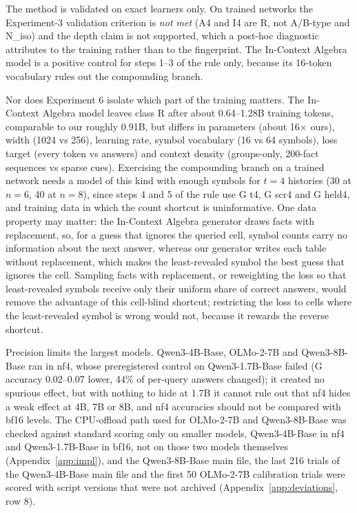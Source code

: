 \documentclass[11pt]{article}
\begin{document}
The method is validated on exact learners only. On trained networks the Experiment-3 validation criterion is \emph{not met} (A4 and I4 are R, not A/B-type and N\_iso) and the depth claim is not supported, which a post-hoc diagnostic attributes to the training rather than to the fingerprint. The In-Context Algebra model is a positive control for steps 1--3 of the rule only, because its 16-token vocabulary rules out the compounding branch.

Nor does Experiment 6 isolate which part of the training matters. The In-Context Algebra model leaves class R after about 0.64--1.28B training tokens, comparable to our roughly 0.91B, but differs in parameters (about 16$\times$ ours), width (1024 vs 256), learning rate, symbol vocabulary (16 vs 64 symbols), loss target (every token vs answers) and context density (groups-only, 200-fact sequences vs sparse cues). Exercising the compounding branch on a trained network needs a model of this kind with enough symbols for $t = 4$ histories (30 at $n = 6$, 40 at $n = 8$), since steps 4 and 5 of the rule use G t4, G scr4 and G held4, and training data in which the count shortcut is uninformative. One data property may matter: the In-Context Algebra generator draws facts with replacement, so, for a guess that ignores the queried cell, symbol counts carry no information about the next answer, whereas our generator writes each table without replacement, which makes the least-revealed symbol the best guess that ignores the cell. Sampling facts with replacement, or reweighting the loss so that least-revealed symbols receive only their uniform share of correct answers, would remove the advantage of this cell-blind shortcut; restricting the loss to cells where the least-revealed symbol is wrong would not, because it rewards the reverse shortcut.

Precision limits the largest models. Qwen3-4B-Base, OLMo-2-7B and Qwen3-8B-Base ran in nf4, whose preregistered control on Qwen3-1.7B-Base failed (G accuracy 0.02--0.07 lower, 44\% of per-query answers changed); it created no spurious effect, but with nothing to hide at 1.7B it cannot rule out that nf4 hides a weak effect at 4B, 7B or 8B, and nf4 accuracies should not be compared with bf16 levels. The CPU-offload path used for OLMo-2-7B and Qwen3-8B-Base was checked against standard scoring only on smaller models, Qwen3-4B-Base in nf4 and Qwen3-1.7B-Base in bf16, not on those two models themselves (Appendix~\ref{app:impl}), and the Qwen3-8B-Base main file, the last 216 trials of the Qwen3-4B-Base main file and the first 50 OLMo-2-7B calibration trials were scored with script versions that were not archived (Appendix~\ref{app:deviations}, row 8).
\end{document}
